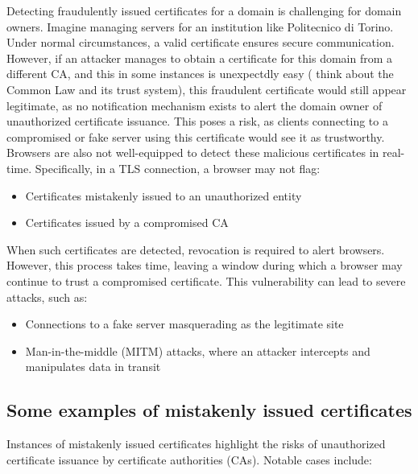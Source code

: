 Detecting fraudulently issued certificates for a domain is challenging
for domain owners. Imagine managing servers for an institution like
Politecnico di Torino. Under normal circumstances, a valid certificate
ensures secure communication. However, if an attacker manages to
obtain a certificate for this domain from a different CA, and this in
some instances is unexpectdly easy ( think about the Common Law and
its trust system), this fraudulent certificate would still appear
legitimate, as no notification mechanism exists to alert the domain
owner of unauthorized certificate issuance. This poses a risk, as
clients connecting to a compromised or fake server using this
certificate would see it as trustworthy. \\
Browsers are also not well-equipped to detect these malicious
certificates in real-time. Specifically, in a TLS connection, a
browser may not flag:
\begin{itemize}
    \item Certificates mistakenly issued to an unauthorized entity
    \item Certificates issued by a compromised CA
\end{itemize}

When such certificates are detected, revocation is required to alert
browsers. However, this process takes time, leaving a window during
which a browser may continue to trust a compromised certificate. This
vulnerability can lead to severe attacks, such as:
\begin{itemize}
    \item Connections to a fake server masquerading as the legitimate
      site
    \item Man-in-the-middle (MITM) attacks, where an attacker
      intercepts and manipulates data in transit
\end{itemize}

\subsection*{Some examples of mistakenly issued certificates}

Instances of mistakenly issued certificates highlight the risks of
unauthorized certificate issuance by certificate authorities (CAs).
Notable cases include:

